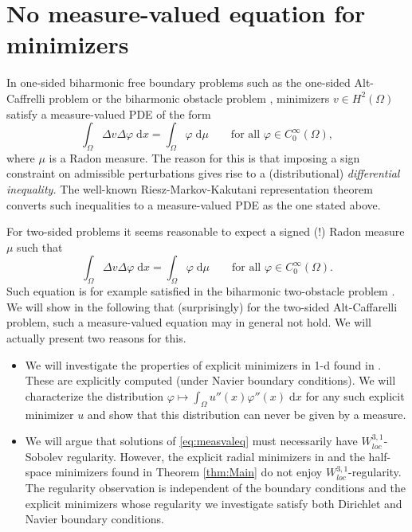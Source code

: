 \documentclass[twoside,11pt]{article}
\theoremstyle{definition}
\begin{document}
\section{No measure-valued equation for minimizers}\label{sec:NoMeasValuedInequality}
In one-sided biharmonic free boundary problems such as the one-sided Alt-Caffrelli problem \cite{MuellerAMPA} or the biharmonic obstacle problem \cite{CaffarelliFriedman}, minimizers $v \in H^2(\Omega)$ satisfy a measure-valued PDE of the form 
\begin{equation*}
    \int_{\Omega} \Delta v \Delta \varphi \; \mathrm{d}x = \int_{\Omega} \varphi \; \mathrm{d}\mu \qquad \textrm{for all $\varphi \in C_0^\infty(\Omega)$},
\end{equation*}
where $\mu$ is a Radon measure. The reason for this is that imposing a sign constraint on admissible perturbations  gives rise to a (distributional) \emph{differential inequality.} 
The well-known Riesz-Markov-Kakutani representation theorem \cite[Theorem 1.39]{EvansGariepy} converts such inequalities to a measure-valued PDE as the one stated above. 

For two-sided problems it seems reasonable to expect a signed (!) Radon measure $\mu$ such that 
\begin{equation}\label{eq:measvaleq}
    \int_{\Omega} \Delta v \Delta \varphi \; \mathrm{d}x = \int_{\Omega} \varphi \; \mathrm{d}\mu \qquad \textrm{for all $\varphi \in C_0^\infty(\Omega)$}.
\end{equation}
Such equation is for example satisfied in the biharmonic two-obstacle problem \cite{TwoSidedObstacle}. We will show in the following that (surprisingly) for the two-sided Alt-Caffarelli problem, such a measure-valued equation may in general not 
hold. We will actually present two reasons for this. 
\begin{itemize}
    \item[(i)] We will investigate the properties of explicit minimizers in 1-d found in \cite{GMMathAnn}. These are explicitly computed (under Navier boundary conditions). We will characterize the distribution $\varphi \mapsto \int_\Omega u''(x) \varphi''(x) \; \mathrm{d}x$ for any such explicit minimizer $u$ and show that this distribution can never be given by a measure. 
    \item[(ii)] We will argue that solutions of \eqref{eq:measvaleq} must necessarily have $W^{3,1}_{loc}$-Sobolev regularity. However, the explicit radial minimizers in \cite[Example 2, Example 4]{GMMathAnn} and the half-space minimizers found in Theorem \ref{thm:Main} do not enjoy $W^{3,1}_{loc}$-regularity. The regularity observation is independent of the boundary conditions and the explicit minimizers whose regularity we investigate satisfy both Dirichlet and Navier boundary conditions.  
 \end{itemize}
\end{document}
